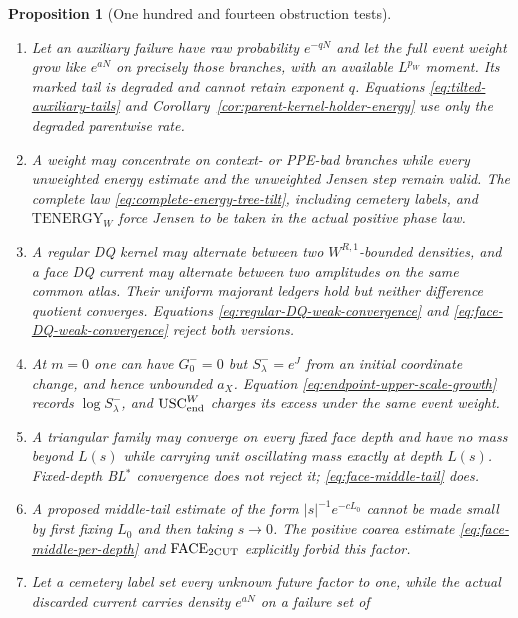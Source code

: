 \documentclass[11pt]{article}
\newtheorem{proposition}[theorem]{Proposition}
\begin{document}
\begin{proposition}[One hundred and fourteen obstruction tests]
\begin{enumerate}[label=\textup{(T\arabic*)}]
      The tilted estimate \eqref{eq:upper-scale-excess-tail}, or its explicit
      parent-kernel $\mathrm{KRH}_{p_W}$ sufficient condition, rejects this
      correlated-mark model.
\item Let an auxiliary failure have raw probability $e^{-qN}$ and let the
      full event weight grow like $e^{aN}$ on precisely those branches, with
      an available $L^{p_W}$ moment.  Its marked tail is degraded and cannot
      retain exponent $q$.  Equations
      \eqref{eq:tilted-auxiliary-tails} and
      Corollary~\ref{cor:parent-kernel-holder-energy} use only the degraded
      parentwise rate.
\item A weight may concentrate on context- or PPE-bad branches while every
      unweighted energy estimate and the unweighted Jensen step remain
      valid.  The complete law \eqref{eq:complete-energy-tree-tilt}, including
      cemetery labels, and $\mathrm{TENERGY}_{W}$ force Jensen to be taken in
      the actual positive phase law.
\item A regular DQ kernel may alternate between two
      $W^{R,1}$-bounded densities, and a face DQ current may alternate between
      two amplitudes on the same common atlas.  Their uniform majorant ledgers
      hold but neither difference quotient converges.  Equations
      \eqref{eq:regular-DQ-weak-convergence} and
      \eqref{eq:face-DQ-weak-convergence} reject both versions.
\item At $m=0$ one can have $G_0^-=0$ but
      $S_\lambda^-=e^J$ from an initial coordinate change, and hence
      unbounded $a_X$.  Equation \eqref{eq:endpoint-upper-scale-growth} records
      $\log S_\lambda^-$, and $\mathrm{USC}_{\rm end}^{W}$ charges its excess
      under the same event weight.
\item A triangular family may converge on every fixed face depth and have
      no mass beyond $L(s)$ while carrying unit oscillating mass exactly at
      depth $L(s)$.  Fixed-depth BL$^*$ convergence does not reject it;
      \eqref{eq:face-middle-tail} does.
\item A proposed middle-tail estimate of the form
      $|s|^{-1}e^{-cL_0}$ cannot be made small by first fixing $L_0$ and then
      taking $s\to0$.  The positive coarea estimate
      \eqref{eq:face-middle-per-depth} and
      $\mathrm{FACE}_{\rm 2CUT}$ explicitly forbid this factor.
\item Let a cemetery label set every unknown future factor to one, while the
      actual discarded current carries density $e^{aN}$ on a failure set of

\end{enumerate}
\end{proposition}
\end{document}
